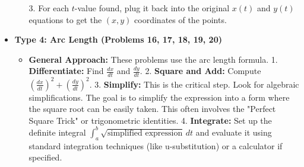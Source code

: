 \documentclass{article}
\begin{document}
\begin{itemize}
\begin{itemize}
            3.  For each $t$-value found, plug it back into the original $x(t)$ and $y(t)$ equations to get the $(x, y)$ coordinates of the points.
        \end{itemize}
    \item \textbf{Type 4: Arc Length (Problems 16, 17, 18, 19, 20)}
        \begin{itemize}
            \item \textbf{General Approach:} These problems use the arc length formula.
            1.  \textbf{Differentiate:} Find $\frac{dx}{dt}$ and $\frac{dy}{dt}$.
            2.  \textbf{Square and Add:} Compute $(\frac{dx}{dt})^2 + (\frac{dy}{dt})^2$.
            3.  \textbf{Simplify:} This is the critical step. Look for algebraic simplifications. The goal is to simplify the expression into a form where the square root can be easily taken. This often involves the "Perfect Square Trick" or trigonometric identities.
            4.  \textbf{Integrate:} Set up the definite integral $\int_a^b \sqrt{\text{simplified expression}} \, dt$ and evaluate it using standard integration techniques (like u-substitution) or a calculator if specified.
        \end{itemize}
\end{itemize}
\end{document}
